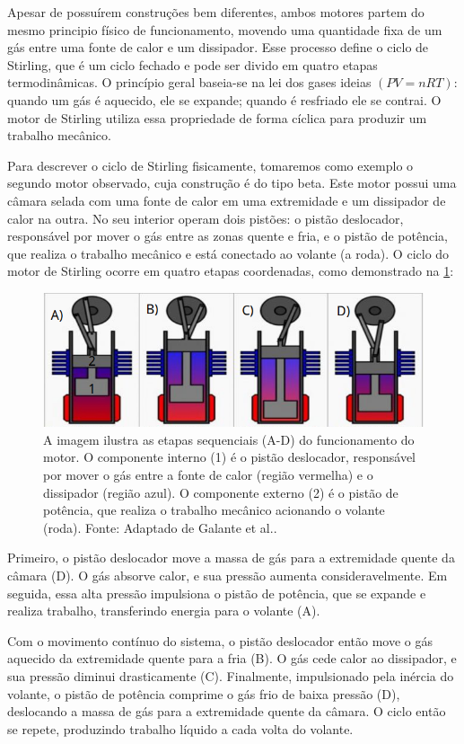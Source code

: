 Apesar de possuírem construções bem diferentes, ambos motores partem do mesmo principio físico de funcionamento, movendo uma quantidade fixa de um gás entre uma fonte de calor e um dissipador. Esse processo define o ciclo de Stirling, que é um ciclo fechado e pode ser divido em quatro etapas termodinâmicas.
O princípio geral baseia-se na lei dos gases ideias \( (PV = nRT)\): quando um gás é aquecido, ele se expande; quando é resfriado ele se contrai. O motor de Stirling utiliza essa propriedade de forma cíclica para produzir um trabalho mecânico.

Para descrever o ciclo de Stirling fisicamente, tomaremos como exemplo o segundo motor observado, cuja construção é do tipo beta. Este motor possui uma câmara selada com uma fonte de calor em uma extremidade e um dissipador de calor na outra. No seu interior operam dois pistões: o pistão deslocador, responsável por mover o gás entre as zonas quente e fria, e o pistão de potência, que realiza o trabalho mecânico e está conectado ao volante (a roda). O ciclo do motor de Stirling ocorre em quatro etapas coordenadas, como demonstrado na \cref{MotorStirling}:

\begin{figure}[H]
	\centering
	\includegraphics[width=0.80\linewidth]{fig/StirlingGenerico.png}
	\caption{A imagem ilustra as etapas sequenciais (A-D) do funcionamento do motor. O componente interno (1) é o pistão deslocador, responsável por mover o gás entre a fonte de calor (região vermelha) e o dissipador (região azul). O componente externo (2) é o pistão de potência, que realiza o trabalho mecânico acionando o volante (roda). Fonte: Adaptado de Galante et al.\cite{galante_2017}.}
	\label{MotorStirling}
\end{figure}

Primeiro, o pistão deslocador move a massa de gás para a extremidade quente da câmara (D). O gás absorve calor, e sua pressão aumenta consideravelmente. Em seguida, essa alta pressão impulsiona o pistão de potência, que se expande e realiza trabalho, transferindo energia para o volante (A).

Com o movimento contínuo do sistema, o pistão deslocador então move o gás aquecido da extremidade quente para a fria (B). O gás cede calor ao dissipador, e sua pressão diminui drasticamente (C). Finalmente, impulsionado pela inércia do volante, o pistão de potência comprime o gás frio de baixa pressão (D), deslocando a massa de gás para a extremidade quente da câmara. O ciclo então se repete, produzindo trabalho líquido a cada volta do volante.
 
